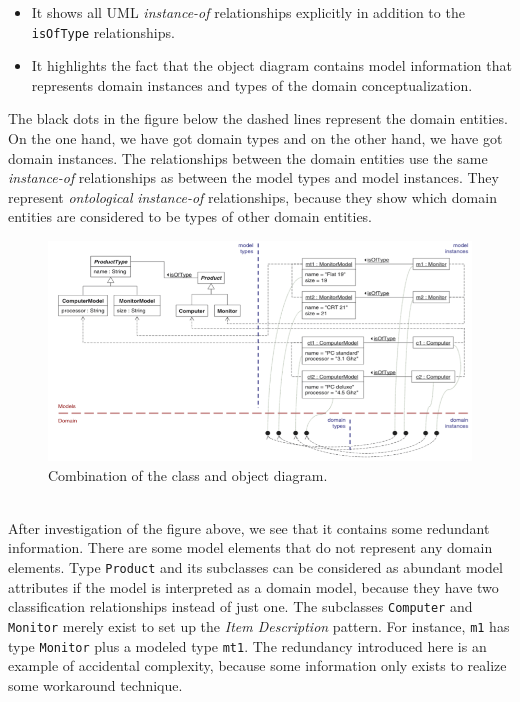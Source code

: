 \begin{itemize}
\item{It shows all UML \textit{instance-of} relationships explicitly in addition to the \texttt{isOfType} relationships.}
\item{It highlights the fact that the object diagram contains model information that represents domain instances and types of the domain conceptualization.}
\end{itemize}
The black dots in the figure below the dashed lines represent the domain entities. On the one hand, we have got domain types and on the other hand, we have got domain instances. The relationships between the domain entities use the same \textit{instance-of} relationships as between the model types and model instances. They represent \textit{ontological} \textit{instance-of} relationships, because they show which domain entities are considered to be types of other domain entities.
\begin{figure}[h!]
\centering
\includegraphics[width=1.0\textwidth]{images/chap2_class_object_diagram.png}
\caption{Combination of the class and object diagram.}
\label{fig:class_object_diagram}
\end{figure} \\
After investigation of the figure above, we see that it contains some redundant information. There are some model elements that do not represent any domain elements. Type \texttt{Product} and its subclasses can be considered as abundant model attributes if the model is interpreted as a domain model, because they have two classification relationships instead of just one. The subclasses \texttt{Computer} and \texttt{Monitor} merely exist to set up the \textit{Item Description} pattern. For instance, \texttt{m1} has type \texttt{Monitor} plus a modeled type \texttt{mt1}. The redundancy introduced here is an example of accidental complexity, because some information only exists to realize some workaround technique.

